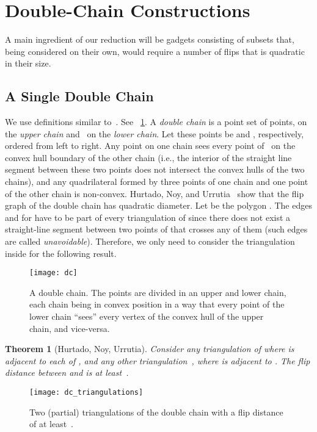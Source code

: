 \documentclass[11pt,a4paper]{article}
\newtheorem{theorem}{Theorem}
\begin{document}
\section{Double-Chain Constructions}
\label{sec_double_chain}
A main ingredient of our reduction will be gadgets consisting of subsets that, being considered on their own, would require a number of flips that is quadratic in their size.

\subsection{A Single Double Chain}

We use definitions similar to~\cite{poly_hard}.
See \figurename~\ref{fig_dc}.
A \emph{double chain}  is a point set of  points,  on the \emph{upper chain} and~ on the \emph{lower chain}.
Let these points be  and , respectively, ordered from left to right.
Any point on one chain sees every point of~ on the convex hull boundary of the other chain (i.e., the interior of the straight line segment between these two points does not intersect the convex hulls of the two chains), and any quadrilateral formed by three points of one chain and one point of the other chain is non-convex.
Hurtado, Noy, and Urrutia~\cite{hurtado_noy_urrutia} show that the flip graph of the double chain has quadratic diameter.
Let  be the polygon .
The edges  and  for  have to be part of every triangulation of  since there does not exist a straight-line segment between two points of  that crosses any of them (such edges are called \emph{unavoidable}).
Therefore, we only need to consider the triangulation inside  for the following result.

\begin{figure}
\centering
\texttt{[image: dc]}
\caption{A double chain.
The points are divided in an upper and lower chain, each chain being in convex position in a way that every point of the lower chain ``sees'' every vertex of the convex hull of the upper chain, and vice-versa.}
\label{fig_dc}
\end{figure}


\begin{theorem}[Hurtado, Noy, Urrutia]\label{thm_dc}
Consider any triangulation  of  where  is adjacent to each of , and any other triangulation~, where  is adjacent to .
The flip distance between  and  is at least~\mbox{}.
\end{theorem}

\begin{figure}
\centering
\texttt{[image: dc\_triangulations]}
\caption{Two (partial) triangulations of the double chain with a flip distance of at least~\mbox{}.}
\label{fig_dc_triangulations}
\end{figure}
\end{document}

